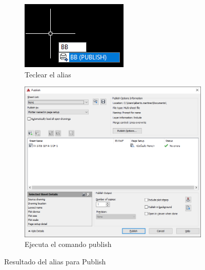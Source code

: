 \documentclass[12pt,letterpaper,final]{report}
\begin{document}
\begin{figure}[H]
	\centering
	\begin{subfigure}[b]{0.43\textwidth}
		\includegraphics[width=\textwidth]{Imagenes/autocad_alias_publish_02}
		\caption{Teclear el alias}
		\label{fig:autocadaliaspublish02}
	\end{subfigure}
	\begin{subfigure}[b]{0.45\textwidth}
		\includegraphics[width=\textwidth]{Imagenes/autocad_alias_publish_03}
		\caption{Ejecuta el comando publish}
		\label{fig:autocadaliaspublish03}
	\end{subfigure}
	\caption{Resultado del alias para Publish}
\end{figure}
\end{document}
